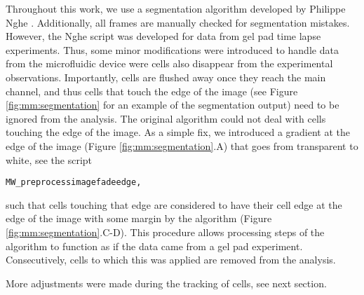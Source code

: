 Throughout this work, we use a segmentation algorithm developed by Philippe Nghe \cite{Walker2016t}. Additionally, all frames are manually checked for segmentation mistakes.
However, the Nghe script was developed for data from gel pad time lapse experiments.
Thus, some minor modifications were introduced to handle data from the microfluidic device were cells also disappear from the experimental observations.
%
Importantly, cells are flushed away once they reach the main channel, and thus cells that touch the edge of the image (see Figure \ref{fig:mm:segmentation} for an example of the segmentation output) need to be ignored from the analysis.
The original algorithm could not deal with cells touching the edge of the image. 
As a simple fix, we introduced a gradient at the edge of the image (Figure \ref{fig:mm:segmentation}.A) that goes from transparent to white, see the script 
\begin{verbatim}
MW_preprocessimagefadeedge, 
\end{verbatim}
such that cells touching that edge are considered to have their cell edge at the edge of the image with some margin by the algorithm (Figure \ref{fig:mm:segmentation}.C-D).
This procedure allows processing steps of the algorithm to function as if the data came from a gel pad experiment.
Consecutively, cells to which this was applied are removed from the analysis.

More adjustments were made during the tracking of cells, see next section.

